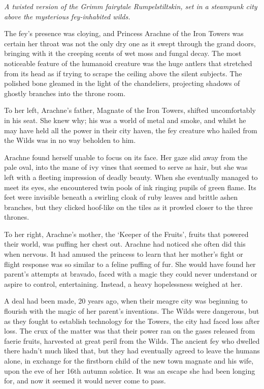 \emph{A twisted version of the Grimm fairytale Rumpelstiltskin, set in a steampunk city above the mysterious fey-inhabited wilds.}

The fey’s presence was cloying, and Princess Arachne of the Iron Towers was certain her throat was not the only dry one as it swept through the grand doors, bringing with it the creeping scents of wet moss and fungal decay. The most noticeable feature of the humanoid creature was the huge antlers that stretched from its head as if trying to scrape the ceiling above the silent subjects. The polished bone gleamed in the light of the chandeliers, projecting shadows of ghostly branches into the throne room. 

To her left, Arachne’s father, Magnate of the Iron Towers, shifted uncomfortably in his seat. She knew why; his was a world of metal and smoke, and whilst he may have held all the power in their city haven, the fey creature who hailed from the Wilds was in no way beholden to him. 

Arachne found herself unable to focus on its face. Her gaze slid away from the pale oval, into the mane of ivy vines that seemed to serve as hair, but she was left with a fleeting impression of deadly beauty. When she eventually managed to meet its eyes, she encountered twin pools of ink ringing pupils of green flame. Its feet were invisible beneath a swirling cloak of ruby leaves and brittle ashen branches, but they clicked hoof-like on the tiles as it prowled closer to the three thrones.  

To her right, Arachne’s mother, the ‘Keeper of the Fruits’, fruits that powered their world, was puffing her chest out. Arachne had noticed she often did this when nervous. It had amused the princess to learn that her mother’s fight or flight response was so similar to a feline puffing of fur. She would have found her parent’s attempts at bravado, faced with a magic they could never understand or aspire to control, entertaining. Instead, a heavy hopelessness weighed at her. 

A deal had been made, 20 years ago, when their meagre city was beginning to flourish with the magic of her parent’s inventions. The Wilds were dangerous, but as they fought to establish technology for the Towers, the city had faced loss after loss. The crux of the matter was that their power ran on the gases released from faerie fruits, harvested at great peril from the Wilds. The ancient fey who dwelled there hadn’t much liked that, but they had eventually agreed to leave the humans alone, in exchange for the firstborn child of the new town magnate and his wife, upon the eve of her 16th autumn solstice. It was an escape she had been longing for, and now it seemed it would never come to pass.

